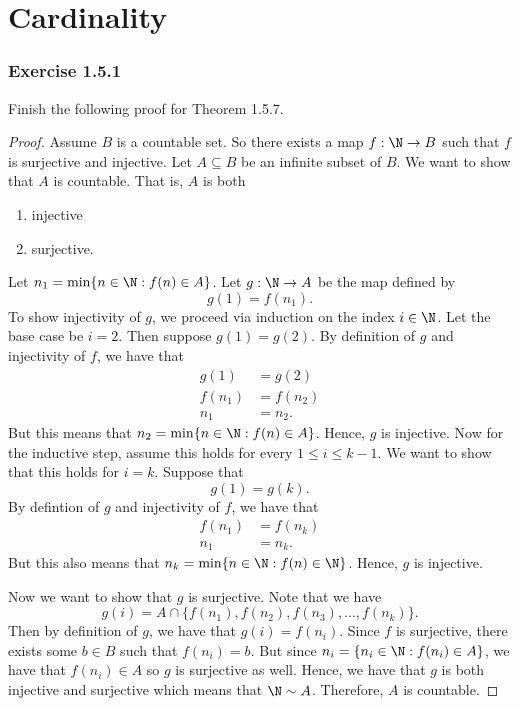 \section{Cardinality}

\subsubsection{Exercise 1.5.1}
Finish the following proof for Theorem 1.5.7.
\begin{proof}
Assume \( B \) is a countable set. So there exists a map \( f: \N \to B \) such that \( f \) is surjective and injective. Let \( A \subseteq B \) be an infinite subset of \( B \). We want to show that \( A \) is countable. That is, \( A \) is both 
\begin{enumerate}
    \item injective 
    \item surjective. 
\end{enumerate}
Let \( n_1 = \min \{ n \in \N: f(n) \in A  \}\). Let \( g: \N \to A  \) be the map defined by 
\[ g(1) = f(n_1).\]
To show injectivity of \( g\), we proceed via induction on the index \( i \in \N \). Let the base case be \( i = 2 \). Then suppose \( g(1) = g(2) \). By definition of \( g \) and injectivity of \( f \), we have that 
\begin{align*}
g(1)&= g(2) \\ 
f(n_1) &= f(n_2) \\
n_1 &= n_2.
\end{align*}
But this means that \( n_2 =\min  \{  n \in \N : f(n) \in A  \}\). Hence, \( g \) is injective. Now for the inductive step, assume this holds for every \( 1 \leq i \leq k - 1 \). We want to show that this holds for \( i = k \). Suppose that 
\[ g(1) = g(k).\]
By defintion of \( g \) and injectivity of \( f \), we have that 
\begin{align*}
f(n_1)&=f(n_k) \\
n_1 &= n_k.
\end{align*}
But this also means that \( n_k = \min \{ n \in \N : f(n) \in \N \} \). Hence, \( g \) is injective. 

Now we want to show that \( g \) is surjective. Note that we have 
\[ g(i) = A \cap \{ f(n_1), f(n_2), f(n_3), ..., f(n_k) \}.\]
Then by definition of \( g \), we have that \( g(i) = f(n_i) \). Since \( f \) is surjective, there exists some \( b \in B \) such that \( f(n_i) = b \). But since \( n_i = \{ n_i \in \N : f(n_i) \in A  \}\), we have that \( f(n_i) \in A \) so \( g \) is surjective as well. Hence, we have that \( g \) is both injective and surjective which means that \( \N \sim A \). Therefore, \( A \) is countable.  

\end{proof} 



